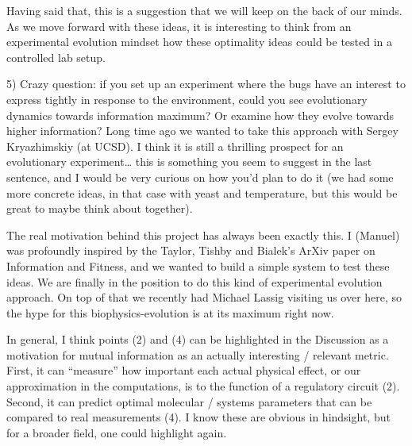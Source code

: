 Having said that, this is a suggestion that we will keep on the back of our
minds. As we move forward with these ideas, it is interesting to think from an
experimental evolution mindset how these optimality ideas could be tested in a
controlled lab setup.

\begin{tcolorbox}
5) Crazy question: if you set up an experiment where the bugs have an interest
to express tightly in response to the environment, could you see evolutionary
dynamics towards information maximum? Or examine how they evolve towards higher
information? Long time ago we wanted to take this approach with Sergey
Kryazhimskiy (at UCSD). I think it is still a thrilling prospect for an
evolutionary experiment… this is something you seem to suggest in the last
sentence, and I would be very curious on how you’d plan to do it (we had some
more concrete ideas, in that case with yeast and temperature, but this would be
great to maybe think about together).
\end{tcolorbox}

The real motivation behind this project has always been exactly this. I (Manuel)
was profoundly inspired by the Taylor, Tishby and Bialek's ArXiv paper on
Information and Fitness, and we wanted to build a simple system to test these
ideas. We are finally in the position to do this kind of experimental evolution
approach. On top of that we recently had Michael Lassig visiting us over here,
so the hype for this biophysics-evolution is at its maximum right now.

\begin{tcolorbox}
In general, I think points (2) and (4) can be highlighted in the Discussion as a
motivation for mutual information as an actually interesting / relevant metric.
First, it can “measure” how important each actual physical effect, or our
approximation in the computations, is to the function of a regulatory circuit
(2). Second, it can predict optimal molecular / systems parameters that can be
compared to real measurements (4). I know these are obvious in hindsight, but
for a broader field, one could highlight again.
\end{tcolorbox}
